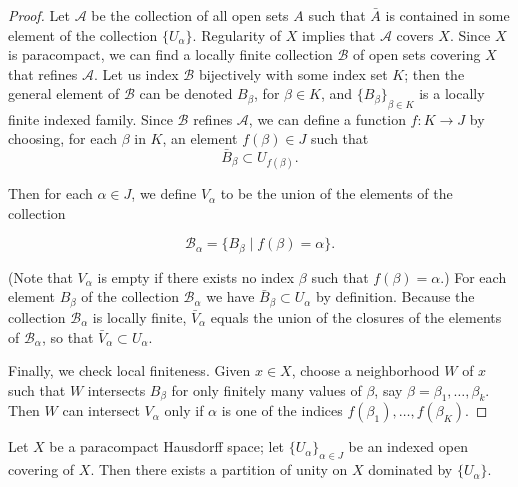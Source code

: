 \begin{proof}
Let \(\mathcal{A}\) be the collection of all open sets \(A\) such that \(\bar{A}\) is contained in some element of the collection \(\{ U_{\alpha }\}\). Regularity of \(X\) implies that \(\mathcal{A}\) covers \(X\). Since \(X\) is paracompact, we can find a locally finite collection \(\mathcal{B}\) of open sets covering \(X\) that refines \(\mathcal{A}\). Let us index \(\mathcal{B}\) bijectively with some index set \(K\); then the general element of \(\mathcal{B}\) can be denoted \(B_{\beta }\), for \(\beta \in K\), and \({\{ B_{\beta }\} }_{\beta \in K}\) is a locally finite indexed family. Since \(\mathcal{B}\) refines \(\mathcal{A}\), we can define a function \(f : K \rightarrow J\) by choosing, for each \(\beta\) in \(K\), an element \(f(\beta) \in J\) such that
\[
\bar{B}_{\beta } \subset {U}_{f(\beta)}.
\]

Then for each \(\alpha \in J\), we define \(V_{\alpha }\) to be the union of the elements of the collection

\[
\mathcal{B}_{\alpha } = \{ {B_{\beta } \mid f(\beta) = \alpha }\}.
\]

(Note that \(V_{\alpha }\) is empty if there exists no index \(\beta\) such that \(f(\beta) = \alpha\).) For each element \(B_{\beta }\) of the collection \(\mathcal{B}_{\alpha }\) we have \(\bar{B}_{\beta } \subset {U}_{\alpha }\) by definition. Because the collection \(\mathcal{B}_{\alpha }\) is locally finite, \(\bar{V}_{\alpha }\) equals the union of the closures of the elements of \(\mathcal{B}_{\alpha }\), so that \(\bar{V}_{\alpha } \subset {U}_{\alpha }\).

Finally, we check local finiteness. Given \(x \in X\), choose a neighborhood \(W\) of \(x\) such that \(W\) intersects \(B_{\beta }\) for only finitely many values of \(\beta\), say \(\beta = {\beta }_{1},\ldots ,{\beta }_{k}\). Then \(W\) can intersect \(V_{\alpha }\) only if \(\alpha\) is one of the indices \(f({\beta }_{1}),\ldots, f({\beta }_{K})\).
\end{proof}

\begin{theorem}
\label{thm:\thetheorem}
Let \(X\) be a paracompact Hausdorff space; let \({\{ U_{\alpha }\} }_{\alpha \in J}\) be an indexed open covering of \(X\). Then there exists a partition of unity on \(X\) dominated by \(\{ U_{\alpha }\}\).
\end{theorem}

